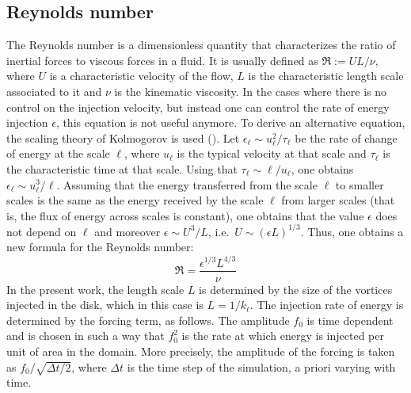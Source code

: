 \documentclass[../main.tex]{subfiles}
\begin{document}
\subsection{Reynolds number}
The Reynolds number is a dimensionless quantity that characterizes the ratio of inertial forces to viscous forces in a fluid. It is usually defined as $\Re:= U L/\nu$, where $U$ is a characteristic velocity of the flow, $L$ is the characteristic length scale associated to it and $\nu$ is the kinematic viscosity. In the cases where there is no control on the injection velocity, but instead one can control the rate of energy injection $\epsilon$, this equation is not useful anymore. To derive an alternative equation, the scaling theory of Kolmogorov is used (\cite{Frisch}). Let $\epsilon_\ell \sim u_\ell^2 / \tau_\ell$ be the rate of change of energy at the scale $\ell$, where $u_\ell$ is the typical velocity at that scale and $\tau_\ell$ is the characteristic time at that scale. Using that $\tau_\ell\sim \ell/u_\ell$, one obtains $\epsilon_\ell \sim u_\ell^3/\ell$. Assuming that the energy transferred from the scale $\ell$ to smaller scales is the same as the energy received by the scale $\ell$ from larger scales (that is, the flux of energy across scales is constant), one obtains that the value $\epsilon$ does not depend on $\ell$ and moreover $\epsilon \sim U^3/L$, i.e.\ $U \sim {(\epsilon L)}^{1/3}$. Thus, one obtains a new formula for the Reynolds number:
\begin{equation}
	\Re=\frac{\epsilon^{1/3} L^{4/3}}{\nu}
\end{equation}
In the present work, the length scale $L$ is determined by the size of the vortices injected in the disk, which in this case is $L=1/k_\ell$. The injection rate of energy is determined by the forcing term, as follows. The amplitude $f_0$ is time dependent and is chosen in such a way that $f_0^2$ is the rate at which energy is injected per unit of area in the domain. More precisely, the amplitude of the forcing is taken as $f_0/\sqrt{\Delta t/2}$, where $\Delta t$ is the time step of the simulation, a priori varying with time.
\end{document}
